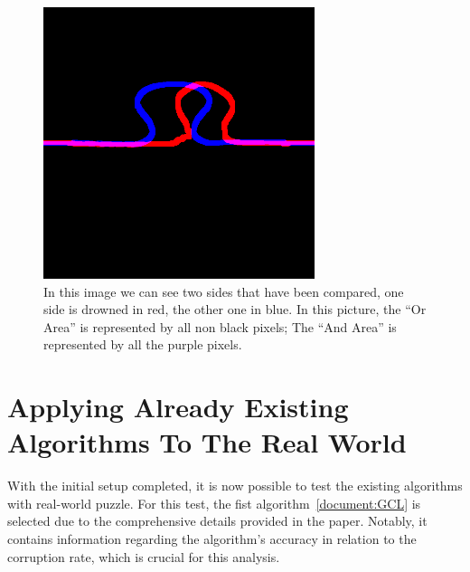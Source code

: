 \documentclass{article}
\begin{document}
\begin{figure}[htbp]
  \centering
  \begin{minipage}[t]{0.44\textwidth}
    \vspace{3pt} %
    \includegraphics[width=\textwidth]{pictures/side_comparation.png}
  \end{minipage}
  \hfill
  \begin{minipage}[t]{0.54\textwidth}
    \caption{\newline
    In this image we can see two sides that have been
    compared, one side is drowned in red, the other one in blue.
    In this picture, the “Or Area” is represented by all non
    black pixels; The “And Area” is represented by all the
    purple pixels.}
  \end{minipage}
\end{figure}
\clearpage

\section{Applying Already Existing Algorithms To The Real World}
With the initial setup completed, it is now possible to
test the existing algorithms with real-world puzzle. For this test,
the fist algorithm~\cref{document:GCL} is selected due to the comprehensive
details provided in the paper. Notably, it contains information
regarding the algorithm's accuracy in relation to the corruption rate,
which is crucial for this analysis.
\end{document}
